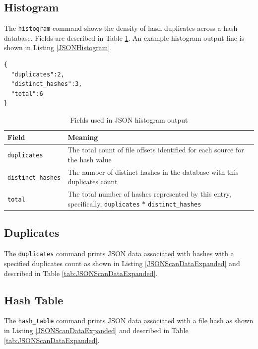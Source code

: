 \documentclass[11pt,fleqn]{article} %
\begin{document}
\subsection{Histogram}
\label{Histogram}
The \verb+histogram+ command shows the density of hash duplicates across a hash database. Fields are described in Table \ref{tab:JSONHistogram}. An example histogram output line is shown in Listing \ref{JSONHistogram}.

\lstset{style=customfile}
\begin{lstlisting}[float, caption={Example JSON histogram format}, label=JSONHistogram]
{
  "duplicates":2,
  "distinct_hashes":3,
  "total":6
}
\end{lstlisting}

\begin{table}[!ht]

\centering
\caption{Fields used in JSON histogram output}
\label{tab:JSONHistogram}
\begin{tabular}{|p{5 cm}|p{8.8 cm}|}
\hline \hline
\textbf{Field} & \textbf{Meaning} \\
\hline
\verb+duplicates+ & The total count of file offsets identified for each source for the hash value\\
\hline
\verb+distinct_hashes+ & The number of distinct hashes in the database with this duplicates count\\
\hline
\verb+total+ & The total number of hashes represented by this entry, specifically, \verb+duplicates+ $*$ \verb+distinct_hashes+\\
\hline
\end{tabular}
\end{table}

\subsection{Duplicates}
The \verb+duplicates+ command prints JSON data associated with hashes with a specified duplicates count as shown in Listing \ref{JSONScanDataExpanded} and described in Table \ref{tab:JSONScanDataExpanded}.\\

\subsection{Hash Table}
The \verb+hash_table+ command prints JSON data associated with a file hash as shown in Listing \ref{JSONScanDataExpanded} and described in Table \ref{tab:JSONScanDataExpanded}.\\
\end{document}
